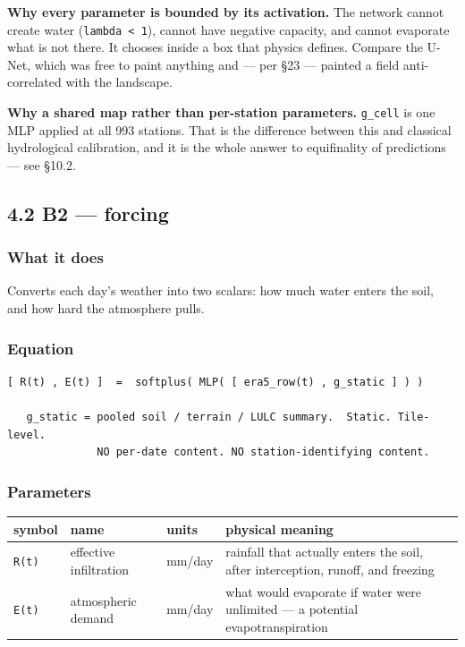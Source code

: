 \documentclass[10pt,a4paper]{article}
\begin{document}
\textbf{Why every parameter is bounded by its activation.} The network cannot create
water (\texttt{lambda < 1}), cannot have negative capacity, and cannot evaporate what is
not there. It chooses inside a box that physics defines. Compare the U-Net, which
was free to paint anything and — per §23 — painted a field anti-correlated with
the landscape.

\textbf{Why a shared map rather than per-station parameters.} \texttt{g\_cell} is one MLP
applied at all 993 stations. That is the difference between this and classical
hydrological calibration, and it is the whole answer to equifinality of
predictions — see §10.2.

\subsection*{4.2 B2 — forcing}

\subsubsection*{What it does}

Converts each day's weather into two scalars: how much water enters the soil,
and how hard the atmosphere pulls.

\subsubsection*{Equation}

\begin{Verbatim}[fontsize=\scriptsize,frame=leftline,framerule=0.6pt,rulecolor=\color{rulegray},xleftmargin=6pt,framesep=6pt,]
   [ R(t) , E(t) ]  =  softplus( MLP( [ era5_row(t) , g_static ] ) )

   g_static = pooled soil / terrain / LULC summary.  Static. Tile-level.
              NO per-date content. NO station-identifying content.
\end{Verbatim}

\subsubsection*{Parameters}

\begin{center}
\small
\begin{tabularx}{\linewidth}{XXXX}
\toprule
\textbf{symbol} & \textbf{name} & \textbf{units} & \textbf{physical meaning} \\
\midrule
\texttt{R(t)} & effective infiltration & mm/day & rainfall that actually enters the soil, after interception, runoff, and freezing \\
\texttt{E(t)} & atmospheric demand & mm/day & what would evaporate if water were unlimited — a potential evapotranspiration \\
\bottomrule
\end{tabularx}
\end{center}
\end{document}
